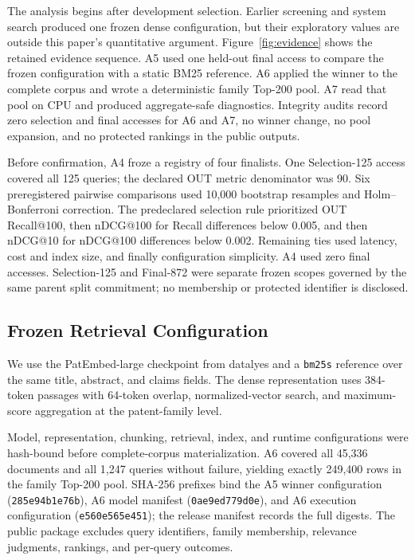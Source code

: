 \documentclass[a4paper,conference]{IEEEtran}
\begin{document}
The analysis begins after development selection. Earlier screening and system
search produced one frozen dense configuration, but their exploratory values
are outside this paper's quantitative argument. Figure~\ref{fig:evidence}
shows the retained evidence sequence. A5 used one held-out final access to
compare the frozen configuration with a static BM25 reference. A6 applied the
winner to the complete corpus and wrote a deterministic family Top-200 pool.
A7 read that pool on CPU and produced aggregate-safe diagnostics. Integrity
audits record zero selection and final accesses for A6 and A7, no winner change,
no pool expansion, and no protected rankings in the public outputs.

Before confirmation, A4 froze a registry of four finalists. One Selection-125
access covered all 125 queries; the declared OUT metric denominator was 90.
Six preregistered pairwise comparisons used 10,000 bootstrap resamples and
Holm--Bonferroni correction. The predeclared selection rule prioritized OUT
Recall@100, then nDCG@100 for Recall differences below 0.005, and then nDCG@10
for nDCG@100 differences below 0.002. Remaining ties used latency, cost and
index size, and finally configuration simplicity. A4 used zero final accesses.
Selection-125 and Final-872 were separate frozen scopes governed by the same
parent split commitment; no membership or protected identifier is disclosed.

\subsection{Frozen Retrieval Configuration}
We use the PatEmbed-large checkpoint from datalyes and a \texttt{bm25s}
reference over the same title, abstract, and claims fields. The dense
representation uses 384-token passages with 64-token overlap, normalized-vector
search, and maximum-score aggregation at the patent-family level.

Model, representation, chunking, retrieval, index, and runtime configurations
were hash-bound before complete-corpus materialization. A6 covered all 45,336
documents and all 1,247 queries without failure, yielding exactly 249,400 rows
in the family Top-200 pool. SHA-256 prefixes bind the A5 winner configuration
(\texttt{285e94b1e76b}), A6 model manifest (\texttt{0ae9ed779d0e}), and A6
execution configuration (\texttt{e560e565e451}); the release manifest records
the full digests. The public package excludes query identifiers, family
membership, relevance judgments, rankings, and per-query outcomes.
\end{document}
